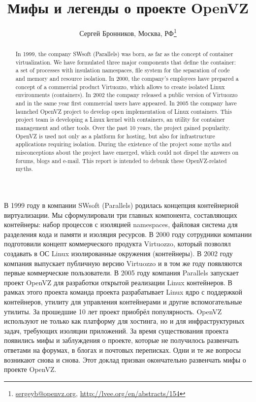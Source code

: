 \documentclass[10pt, a5paper]{article}
\begin{document}
\title{Мифы и легенды о проекте OpenVZ}
\author{Сергей Бронников, Москва, РФ\footnote{\url{sergeyb@openvz.org}, \url{http://lvee.org/en/abstracts/154}}}
\maketitle
\begin{abstract}
In 1999, the company SWsoft (Parallels) was born, as far as the concept of container virtualization. We have formulated three major compo\-nents that define the container: a set of processes with insulation namespaces, file system for the separation of code and memory and resource isolation. In 2000, the company's employees have prepared a concept of a commercial product Virtuozzo, which allows to create isolated Linux environments (containers). In 2002 the company released a public version of Virtuozzo and in the same year first commercial users have \linebreak appeared. In 2005 the company have launched OpenVZ project to develop open implementation of Linux containers. This project team is developing a Linux kernel with containers, an utility for container management and other tools. Over the past 10 years, the project gained popularity. OpenVZ is used not only as a platform for hosting, but also for infrastructure applications requiring isolation. During the existence of the project some myths and misconceptions about the project have emerged, which could not dispel the answers on forums, blogs and e-mail. This report is intended to debunk these OpenVZ-related myths.
\end{abstract}
В 1999 году в компании SWsoft (Parallels) родилась концепция контейнерной виртуализации. Мы сформулировали три главных компонента, составляющих контейнеры: набор процессов с изоляцией namespaces, файловая система для разделения кода и памяти и изоляция ресурсов. В 2000 году сотрудники компании подготовили концепт коммерческого продукта Virtuozzo, который позволял создавать в ОС Linux изолированные окружения (контейнеры). В 2002 году компания выпускает публичную версию Virtuozzo и в том же году появляются первые коммерческие пользователи. В 2005 году компания Parallels запускает проект OpenVZ для разработки открытой реализации Linux контейнеров. В рамках этого проекта команда проекта разрабатывает Linux ядро с поддержкой контейнеров, утилиту для управления контейнерами и другие вспомогательные утилиты. За прошедшие 10 лет проект приобрёл популярность. OpenVZ используют не только как платформу для хостинга, но и для инфраструктурных задач, требующих изоляции приложений.  За время существования проекта появились мифы и заблуждения о проекте, которые не получилось развенчать ответами на форумах, в блогах и почтовых переписках. Одни и те же вопросы возникают снова и снова. Этот доклад призван окончательно развенчать мифы о проекте OpenVZ.
\end{document}
